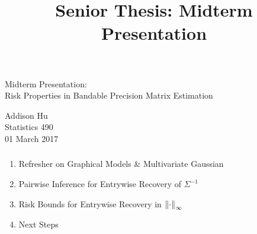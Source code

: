 
\newcommand{\blueone}{{\color{yaleblue} 1}}
\newcommand{\greyzero}{{\color{solarized@base00} 0}}
\usepackage{sty/personalmacros}
\usepackage{sty/personalslides}


\title{Senior Thesis: Midterm Presentation}
\begin{frame}[fragile] \frametitle{}
\vfill
\vspace{0.2cm}
{
    \color{yaleblue}
    \fontsize{0.5cm}{0cm}\selectfont
    Midterm Presentation: \\
}
\vspace{1.0cm}
{
    \fontsize{0.7cm}{0cm}\selectfont
    Risk Properties in Bandable Precision Matrix Estimation\\
}

\hfill

\vspace{1.8cm}
\begin{minipage}{1.0\textwidth}\raggedleft
    \color{yaleblue}
    Addison Hu   \\
    Statistics 490 \\
    01 March 2017
\end{minipage}
\end{frame}
\begin{frame}[fragile] \frametitle{}
    \begin{enumerate}
        \item Refresher on Graphical Models \& Multivariate Gaussian
        \item Pairwise Inference for Entrywise Recovery of $\Sigma^{-1}$
        \item Risk Bounds for Entrywise Recovery in $\left\lVert\cdot\right\rVert_\infty$
        \item Next Steps
    \end{enumerate}
\end{frame}
